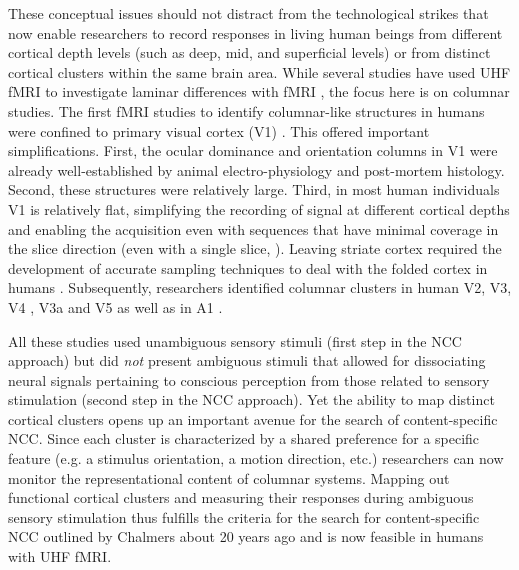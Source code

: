 These conceptual issues should not distract from the technological strikes that now enable researchers to record responses in living human beings from different cortical depth levels (such as deep, mid, and superficial levels) or from distinct cortical clusters within the same brain area. While several studies have used UHF fMRI to investigate laminar differences with fMRI \parencite{Ress2007, Polimeni2010, Koopmans2010, Koopmans2011, Olman2012, DeMartino2013, Huber2015, Muckli2015, Kok2016, Huber2017, Marquardt2018, Kashyap2018}, the focus here is on columnar studies. The first fMRI studies to identify columnar-like structures in humans were confined to primary visual cortex (V1) \parencite{Cheng2001, Yacoub2007, Yacoub2008}. This offered important simplifications. First, the ocular dominance and orientation columns in V1 were already well-established by animal electro-physiology \parencite{Hubel1974} and post-mortem histology. Second, these structures were relatively large. Third, in most human individuals V1 is relatively flat, simplifying the recording of signal at different cortical depths and enabling the acquisition even with sequences that have minimal coverage in the slice direction (even with a single slice, \cite{Yacoub2008}). Leaving striate cortex required the development of accurate sampling techniques to deal with the folded cortex in humans \parencite{Polimeni2017, Kemper2017}. Subsequently, researchers identified columnar clusters in human V2, V3, V4 \parencite{Nasr2016, Tootell2017}, V3a \parencite{Goncalves2015} and V5 \parencite{Zimmermann2011} as well as in A1 \parencite{DeMartino2015}.

All these studies used unambiguous sensory stimuli (first step in the NCC approach) but did \textit{not} present ambiguous stimuli that allowed for dissociating neural signals pertaining to conscious perception from those related to sensory stimulation (second step in the NCC approach). Yet the ability to map distinct cortical clusters opens up an important avenue for the search of content-specific NCC. Since each cluster is characterized by a shared preference for a specific feature (e.g. a stimulus orientation, a motion direction, etc.) researchers can now monitor the representational content of columnar systems. Mapping out functional cortical clusters and measuring their responses during ambiguous sensory stimulation thus fulfills the criteria for the search for content-specific NCC outlined by Chalmers \parencite*{Chalmers2000} about 20 years ago and is now feasible in humans with UHF fMRI.

